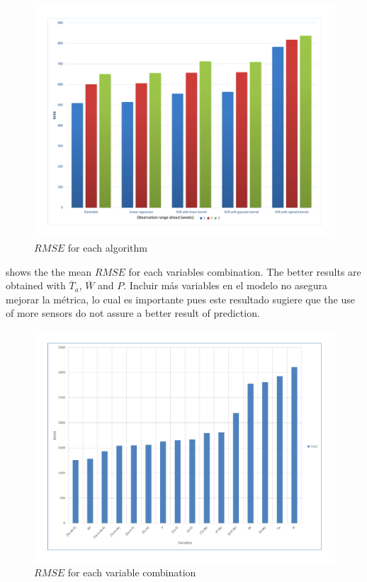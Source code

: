 %
\begin{figure}[H] 
 \centering
 \includegraphics[width=1.0\linewidth]{Usado_Algorithms-RMSE}
 \caption{$RMSE$ for each algorithm} 
 \label{figura6} 
\end{figure}
%
 shows the the mean $RMSE$ for each variables combination. The better results are obtained with $\overline{T}_{a}$, $\overline{W}$ and $P$.  Incluir más variables en el modelo no asegura mejorar la métrica, lo cual es importante pues este resultado sugiere que the use of more sensors do not assure a better result of prediction. 
%
\begin{figure}[H] 
 \centering
 \includegraphics[width=1.0\linewidth]{Usado_Variables-RMSE}
 \caption{$RMSE$ for each variable combination} 
 \label{figura7} 
\end{figure}
%


